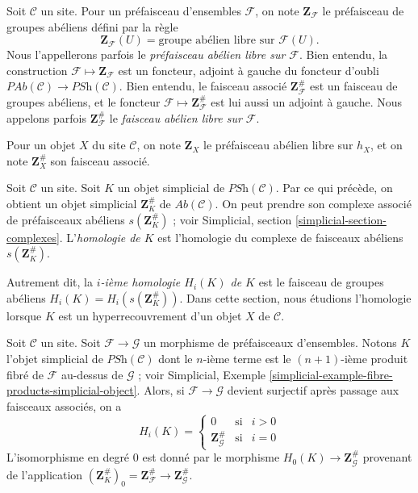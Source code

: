 \noindent
Soit $\mathcal{C}$ un site.
Pour un préfaisceau d'ensembles $\mathcal{F}$, on note $\mathbf{Z}_\mathcal{F}$
le préfaisceau de groupes abéliens défini par la règle
$$
\mathbf{Z}_\mathcal{F}(U) = \text{groupe abélien libre sur }\mathcal{F}(U).
$$
Nous l'appellerons parfois le {\it préfaisceau abélien libre sur $\mathcal{F}$}.
Bien entendu, la construction $\mathcal{F} \mapsto \mathbf{Z}_\mathcal{F}$
est un foncteur, adjoint à gauche du foncteur d'oubli
$\textit{PAb}(\mathcal{C}) \to \textit{PSh}(\mathcal{C})$.
Bien entendu, le faisceau associé $\mathbf{Z}_\mathcal{F}^\#$ est
un faisceau de groupes abéliens, et le foncteur
$\mathcal{F} \mapsto \mathbf{Z}_\mathcal{F}^\#$ est lui aussi
un adjoint à gauche. Nous appelons parfois $\mathbf{Z}_\mathcal{F}^\#$
le {\it faisceau abélien libre sur $\mathcal{F}$}.

\medskip\noindent
Pour un objet $X$ du site $\mathcal{C}$, on note
$\mathbf{Z}_X$ le préfaisceau abélien libre sur $h_X$, et
on note $\mathbf{Z}_X^\#$ son faisceau associé.

\begin{definition}
\label{definition-homology}
Soit $\mathcal{C}$ un site.
Soit $K$ un objet simplicial de $\textit{PSh}(\mathcal{C})$.
Par ce qui précède, on obtient un objet simplicial $\mathbf{Z}_K^\#$ de
$\textit{Ab}(\mathcal{C})$. On peut prendre son
complexe associé de préfaisceaux abéliens $s(\mathbf{Z}_K^\#)$ ; voir
Simplicial, section \ref{simplicial-section-complexes}.
L'{\it homologie de $K$} est l'homologie du
complexe de faisceaux abéliens $s(\mathbf{Z}_K^\#)$.
\end{definition}

\noindent
Autrement dit, la {\it $i$-ième homologie $H_i(K)$ de $K$}
est le faisceau de groupes abéliens $H_i(K) = H_i(s(\mathbf{Z}_K^\#))$.
Dans cette section, nous étudions l'homologie lorsque $K$
est un hyperrecouvrement d'un objet $X$ de $\mathcal{C}$.

\begin{lemma}
\label{lemma-compare-cosk0}
Soit $\mathcal{C}$ un site.
Soit $\mathcal{F} \to \mathcal{G}$ un morphisme
de préfaisceaux d'ensembles. Notons $K$ l'objet
simplicial de $\textit{PSh}(\mathcal{C})$ dont le $n$-ième
terme est le $(n + 1)$-ième produit fibré de $\mathcal{F}$
au-dessus de $\mathcal{G}$ ; voir
Simplicial, Exemple \ref{simplicial-example-fibre-products-simplicial-object}.
Alors, si $\mathcal{F} \to \mathcal{G}$ devient surjectif après
passage aux faisceaux associés, on a
$$
H_i(K) =
\left\{
\begin{matrix}
0 & \text{si} & i > 0\\
\mathbf{Z}_\mathcal{G}^\# & \text{si} & i = 0
\end{matrix}
\right.
$$
L'isomorphisme en degré $0$ est donné par le
morphisme $H_0(K) \to \mathbf{Z}_\mathcal{G}^\#$
provenant de l'application $(\mathbf{Z}_K^\#)_0 =
\mathbf{Z}_\mathcal{F}^\# \to \mathbf{Z}_\mathcal{G}^\#$.
\end{lemma}

